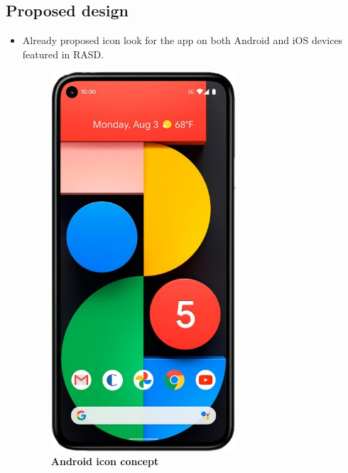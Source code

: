 \subsection{Proposed design}

\captionsetup{justification=centering}
\begin{itemize}
\item Already proposed icon look for the app on both Android and iOS devices featured in RASD.
\begin{figure}[!htb]
\centering
\begin{minipage}{0.4\textwidth}
\centering
\includegraphics[width=0.65\textwidth]{Images/App/Android_AppIcon}
\caption{\label{fig:androidappicon}\textbf{Android icon concept}}
\end{minipage}
\begin{minipage}{0.4\textwidth}
\centering

\end{minipage}
\end{figure}
\end{itemize}
